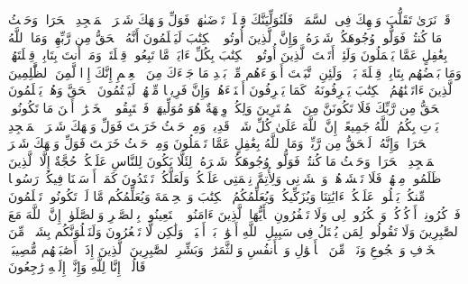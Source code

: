 \startbuffer[\q:2:144]
قَدۡ نَرَىٰ تَقَلُّبَ وَجۡهِكَ فِی ٱلسَّمَاۤءِۖ فَلَنُوَلِّیَنَّكَ قِبۡلَةࣰ تَرۡضَىٰهَاۚ فَوَلِّ وَجۡهَكَ شَطۡرَ ٱلۡمَسۡجِدِ ٱلۡحَرَامِۚ وَحَیۡثُ مَا كُنتُمۡ فَوَلُّوا۟ وُجُوهَكُمۡ شَطۡرَهُۥۗ وَإِنَّ ٱلَّذِینَ أُوتُوا۟ ٱلۡكِتَٰبَ لَیَعۡلَمُونَ أَنَّهُ ٱلۡحَقُّ مِن رَّبِّهِمۡۗ وَمَا ٱللَّهُ بِغَٰفِلٍ عَمَّا یَعۡمَلُونَ%
\stopbuffer
\startbuffer[\q:2:145]
وَلَئِنۡ أَتَیۡتَ ٱلَّذِینَ أُوتُوا۟ ٱلۡكِتَٰبَ بِكُلِّ ءَایَةࣲ مَّا تَبِعُوا۟ قِبۡلَتَكَۚ وَمَاۤ أَنتَ بِتَابِعࣲ قِبۡلَتَهُمۡۚ وَمَا بَعۡضُهُم بِتَابِعࣲ قِبۡلَةَ بَعۡضࣲۚ وَلَئِنِ ٱتَّبَعۡتَ أَهۡوَاۤءَهُم مِّنۢ بَعۡدِ مَا جَاۤءَكَ مِنَ ٱلۡعِلۡمِ إِنَّكَ إِذࣰا لَّمِنَ ٱلظَّٰلِمِینَ%
\stopbuffer
\startbuffer[\q:2:146]
ٱلَّذِینَ ءَاتَیۡنَٰهُمُ ٱلۡكِتَٰبَ یَعۡرِفُونَهُۥ كَمَا یَعۡرِفُونَ أَبۡنَاۤءَهُمۡۖ وَإِنَّ فَرِیقࣰا مِّنۡهُمۡ لَیَكۡتُمُونَ ٱلۡحَقَّ وَهُمۡ یَعۡلَمُونَ%
\stopbuffer
\startbuffer[\q:2:147]
ٱلۡحَقُّ مِن رَّبِّكَ فَلَا تَكُونَنَّ مِنَ ٱلۡمُمۡتَرِینَ%
\stopbuffer
\startbuffer[\q:2:148]
وَلِكُلࣲّ وِجۡهَةٌ هُوَ مُوَلِّیهَاۖ فَٱسۡتَبِقُوا۟ ٱلۡخَیۡرَٰتِۚ أَیۡنَ مَا تَكُونُوا۟ یَأۡتِ بِكُمُ ٱللَّهُ جَمِیعًاۚ إِنَّ ٱللَّهَ عَلَىٰ كُلِّ شَیۡءࣲ قَدِیرࣱ%
\stopbuffer
\startbuffer[\q:2:149]
وَمِنۡ حَیۡثُ خَرَجۡتَ فَوَلِّ وَجۡهَكَ شَطۡرَ ٱلۡمَسۡجِدِ ٱلۡحَرَامِۖ وَإِنَّهُۥ لَلۡحَقُّ مِن رَّبِّكَۗ وَمَا ٱللَّهُ بِغَٰفِلٍ عَمَّا تَعۡمَلُونَ%
\stopbuffer
\startbuffer[\q:2:150]
وَمِنۡ حَیۡثُ خَرَجۡتَ فَوَلِّ وَجۡهَكَ شَطۡرَ ٱلۡمَسۡجِدِ ٱلۡحَرَامِۚ وَحَیۡثُ مَا كُنتُمۡ فَوَلُّوا۟ وُجُوهَكُمۡ شَطۡرَهُۥ لِئَلَّا یَكُونَ لِلنَّاسِ عَلَیۡكُمۡ حُجَّةٌ إِلَّا ٱلَّذِینَ ظَلَمُوا۟ مِنۡهُمۡ فَلَا تَخۡشَوۡهُمۡ وَٱخۡشَوۡنِی وَلِأُتِمَّ نِعۡمَتِی عَلَیۡكُمۡ وَلَعَلَّكُمۡ تَهۡتَدُونَ%
\stopbuffer
\startbuffer[\q:2:151]
كَمَاۤ أَرۡسَلۡنَا فِیكُمۡ رَسُولࣰا مِّنكُمۡ یَتۡلُوا۟ عَلَیۡكُمۡ ءَایَٰتِنَا وَیُزَكِّیكُمۡ وَیُعَلِّمُكُمُ ٱلۡكِتَٰبَ وَٱلۡحِكۡمَةَ وَیُعَلِّمُكُم مَّا لَمۡ تَكُونُوا۟ تَعۡلَمُونَ%
\stopbuffer
\startbuffer[\q:2:152]
فَٱذۡكُرُونِیۤ أَذۡكُرۡكُمۡ وَٱشۡكُرُوا۟ لِی وَلَا تَكۡفُرُونِ%
\stopbuffer
\startbuffer[\q:2:153]
یَٰۤأَیُّهَا ٱلَّذِینَ ءَامَنُوا۟ ٱسۡتَعِینُوا۟ بِٱلصَّبۡرِ وَٱلصَّلَوٰةِۚ إِنَّ ٱللَّهَ مَعَ ٱلصَّٰبِرِینَ%
\stopbuffer
\startbuffer[\q:2:154]
وَلَا تَقُولُوا۟ لِمَن یُقۡتَلُ فِی سَبِیلِ ٱللَّهِ أَمۡوَٰتُۢۚ بَلۡ أَحۡیَاۤءࣱ وَلَٰكِن لَّا تَشۡعُرُونَ%
\stopbuffer
\startbuffer[\q:2:155]
وَلَنَبۡلُوَنَّكُم بِشَیۡءࣲ مِّنَ ٱلۡخَوۡفِ وَٱلۡجُوعِ وَنَقۡصࣲ مِّنَ ٱلۡأَمۡوَٰلِ وَٱلۡأَنفُسِ وَٱلثَّمَرَٰتِۗ وَبَشِّرِ ٱلصَّٰبِرِینَ%
\stopbuffer
\startbuffer[\q:2:156]
ٱلَّذِینَ إِذَاۤ أَصَٰبَتۡهُم مُّصِیبَةࣱ قَالُوۤا۟ إِنَّا لِلَّهِ وَإِنَّاۤ إِلَیۡهِ رَٰجِعُونَ%
\stopbuffer
\startbuffer[\q:2:157]
